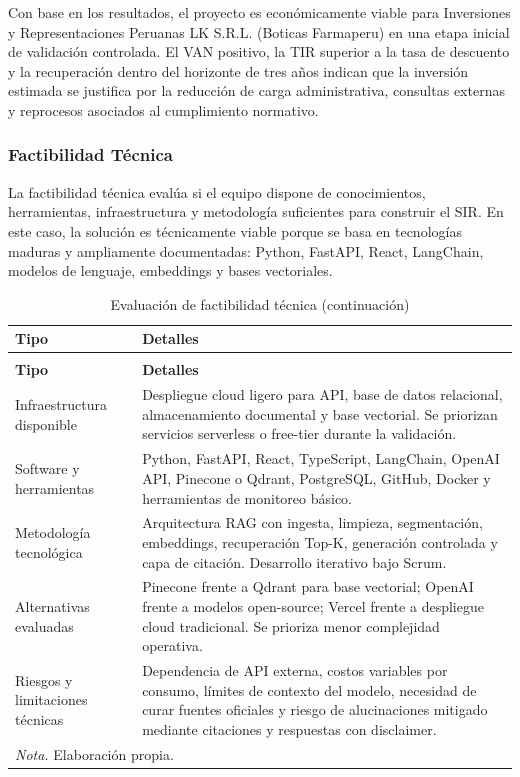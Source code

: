 \documentclass[12pt,a4paper,oneside]{report}
\begin{document}
Con base en los resultados, el proyecto es económicamente viable para Inversiones y Representaciones Peruanas LK S.R.L. (Boticas Farmaperu) en una etapa inicial de validación controlada. El VAN positivo, la TIR superior a la tasa de descuento y la recuperación dentro del horizonte de tres años indican que la inversión estimada se justifica por la reducción de carga administrativa, consultas externas y reprocesos asociados al cumplimiento normativo.

\subsubsection{Factibilidad Técnica}\label{subsubsec:factibilidad-tecnica}

La factibilidad técnica evalúa si el equipo dispone de conocimientos, herramientas, infraestructura y metodología suficientes para construir el SIR. En este caso, la solución es técnicamente viable porque se basa en tecnologías maduras y ampliamente documentadas: Python, FastAPI, React, LangChain, modelos de lenguaje, embeddings y bases vectoriales.

\begin{longtable}{@{}p{}p{}@{}}
\caption{Evaluación de factibilidad técnica}\label{tab:factibilidad-tecnica}\\
\toprule
\textbf{Tipo} & \textbf{Detalles} \\
\midrule
\endfirsthead
\caption[]{Evaluación de factibilidad técnica (continuación)}\\
\toprule
\textbf{Tipo} & \textbf{Detalles} \\
\midrule
\endhead
Infraestructura disponible & Despliegue cloud ligero para API, base de datos relacional, almacenamiento documental y base vectorial. Se priorizan servicios serverless o free-tier durante la validación. \\
Software y herramientas & Python, FastAPI, React, TypeScript, LangChain, OpenAI API, Pinecone o Qdrant, PostgreSQL, GitHub, Docker y herramientas de monitoreo básico. \\
Metodología tecnológica & Arquitectura RAG con ingesta, limpieza, segmentación, embeddings, recuperación Top-K, generación controlada y capa de citación. Desarrollo iterativo bajo Scrum. \\
Alternativas evaluadas & Pinecone frente a Qdrant para base vectorial; OpenAI frente a modelos open-source; Vercel frente a despliegue cloud tradicional. Se prioriza menor complejidad operativa. \\
Riesgos y limitaciones técnicas & Dependencia de API externa, costos variables por consumo, límites de contexto del modelo, necesidad de curar fuentes oficiales y riesgo de alucinaciones mitigado mediante citaciones y respuestas con disclaimer. \\
\bottomrule
\multicolumn{2}{p{0.94\textwidth}}{\normalsize \textit{Nota.} Elaboración propia.}\\
\end{longtable}
\end{document}
